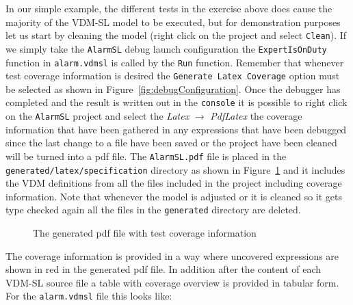 In our simple example, the different tests in the exercise above does
cause the majority of the VDM-SL model to be executed, but for
demonstration purposes let us start by cleaning the model (right click
on the project and select \texttt{Clean}). If we simply take the
\texttt{AlarmSL} debug launch configuration the
\verb|ExpertIsOnDuty| function in \verb|alarm.vdmsl| is called by the
\texttt{Run} function. Remember that whenever test coverage
information is desired the \texttt{Generate Latex Coverage} option
must be selected as shown in Figure~\ref{fig:debugConfiguration}. 
Once the debugger has completed and the result
is written out in the \texttt{console} it is possible to right click
on the \texttt{AlarmSL} project and select the \emph{Latex} $
\rightarrow $ \emph{PdfLatex} the coverage information that have
been gathered in any expressions that have been debugged since the
last change to a file have been saved or the project have been cleaned
will be turned into a pdf file. The \texttt{AlarmSL.pdf} file is
placed in the \texttt{generated/latex/specification} directory as shown in
Figure~\ref{fig:testcov} and it includes the
VDM definitions from all the files included in the project including
coverage information. Note that whenever the model is adjusted or it
is cleaned so it gets type checked again all the files in the
\texttt{generated} directory are deleted.

\begin{figure}[tb]
\begin{center}
\end{center}
\caption{The generated pdf file with test coverage information\label{fig:testcov}}
\end{figure}

The coverage information is provided in a way where uncovered
expressions are shown in red in the generated pdf file. In addition
after the content of each VDM-SL source file a table with coverage
overview is provided in tabular form. For the \texttt{alarm.vdmsl}
file this looks like:

